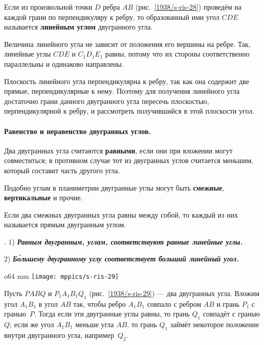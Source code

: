 Если из произвольной точки $D$ ребра $AB$ (рис.~\ref{1938/s-ris-28}) проведём на каждой грани по перпендикуляру к ребру, то образованный ими угол $CDE$ называется \textbf{линейным углом} двугранного угла.

Величина линейного угла не зависит от положения его вершины на ребре.
Так, линейные углы $CDE$ и $C_1D_1E_1$ равны, потому что их стороны соответственно параллельны и одинаково направлены.

Плоскость линейного угла перпендикулярна к ребру, так как она содержит две прямые, перпендикулярные к нему.
Поэтому для получения линейного угла достаточно грани данного двугранного угла пересечь плоскостью, перпендикулярной к ребру, и рассмотреть получившийся в этой плоскости угол.

\paragraph{Равенство и неравенство двугранных углов.}\label{1938/s39}
Два двугранных угла считаются \textbf{равными}, если они при вложении могут совместиться;
в противном случае тот из двугранных углов считается меньшим, который составит часть другого угла.

Подобно углам в планиметрии двугранные углы могут быть \textbf{смежные}, \textbf{вертикальные} и прочие.

Если два смежных двугранных угла равны между собой, то каждый из них называется прямым двугранным углом.

\medskip

.
1) \textbf{\emph{Равным двугранным, углам, соответствуют равные линейные углы.}}

2) \textbf{\emph{Б\'{о}льшему двугранному углу соответствует больший линейный угол.}}

\begin{wrapfigure}{o}{64 mm}
\centering
\texttt{[image: mppics/s-ris-29]}
\caption{}\label{1938/s-ris-29}
\end{wrapfigure}

Пусть $PABQ$ и $P_1A_1B_1Q_1$ (рис.~\ref{1938/s-ris-29}) — два двугранных угла.
Вложим угол $A_1B_1$ в угол $AB$ так, чтобы ребро $A_1B_1$ совпало с ребром $AB$ и грань $P_1$ с гранью~$P$.
Тогда если эти двугранные углы равны, то грань $Q_1$ совпадёт с гранью $Q$;
если же угол $A_1B_1$ меньше угла $AB$, то грань $Q_1$ займёт некоторое положение внутри двугранного угла, например~$Q_2$.



